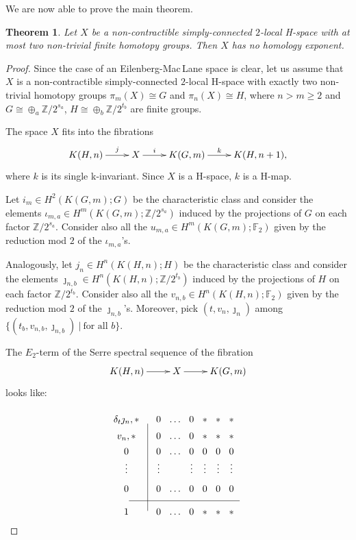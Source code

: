 \documentclass{amsart}
\newtheorem{thm}{Theorem}[section]
\theoremstyle{definition}
\theoremstyle{remark}
\newcommand{\Z}{\mathbb{Z}}
\newcommand{\F}{\mathbb{F}}
\renewcommand{\geq}{\geqslant}
\begin{document}
We are now able to prove the main theorem.

\begin{thm}\label{t:main}
Let $X$ be a non-contractible simply-connected $2$-local H-space with at most two non-trivial finite homotopy groups. Then $X$ has no homology exponent.
\end{thm}

\begin{proof}
Since the case of an Eilenberg-Mac\,Lane space is clear, let us assume that $X$ is a non-contractible simply-connected $2$-local H-space with exactly two non-trivial homotopy groups $\pi_m(X)\cong G$ and $\pi_n(X)\cong H$, where $n>m\geq2$ and $G\cong\oplus_a\Z/2^{s_a}$, $H\cong\oplus_b\Z/2^{t_b}$ are finite groups. 

The space $X$ fits into the fibrations
$$\xymatrix{
K(H,n)\ar[r]^-j &X\ar[r]^-i &K(G,m)\ar[r]^-k &K(H,n+1),
}$$
where $k$ is its single k-invariant. Since $X$ is a H-space, $k$ is a H-map.


Let $i_m\in H^2(K(G,m);G)$ be the characteristic class and consider the elements $\iota_{m,a}\in H^m(K(G,m);\Z/2^{s_a})$ induced by the projections of $G$ on each factor $\Z/2^{s_a}$. Consider also all the $u_{m,a}\in H^m(K(G,m);\F_2)$ given by the reduction mod $2$ of the $\iota_{m,a}$'s.

Analogously, let $j_n\in H^n(K(H,n);H)$ be the characteristic class and consider the elements $\jmath_{n,b}\in H^n(K(H,n);\Z/2^{t_b})$ induced by the projections of $H$ on each factor $\Z/2^{t_b}$. Consider also all the $v_{n,b}\in H^n(K(H,n);\F_2)$ given by the reduction mod $2$ of the $\jmath_{n,b}$'s. Moreover, pick $(t,v_n,\jmath_n)$ among $\{(t_b,v_{n,b},\jmath_{n,b})\ |\ \text{for all $b$}\}$.

The $E_2$-term of the Serre spectral sequence of the fibration $$\xymatrix{K(H,n)\ar[r]&X\ar[r]&K(G,m)}$$ looks like:
$$\xymatrix@R=0.1cm@C=0.1cm{
&&\\
{\delta_t\jmath_n,*}  &&0 &\dots &0 &{*} &{*} &{*}\\
{v_n,*}  &&0 &\dots &0 &{*} &{*} &{*}\\
{0} &&0 &\dots &0 &0 &0 &0\\
{\vdots} &&\vdots & &\vdots &\vdots &\vdots &\vdots\\
{0} &&0 &\dots &0 &0 &0 &0\\ \ar@{-}[rrrrrrrr] &&&&&&&&\\
{1} &\ar@{-}[uuuuuu] &{0} &{\dots} &{0} &{*} &{*} &{*}}
$$


\end{proof}
\end{document}
